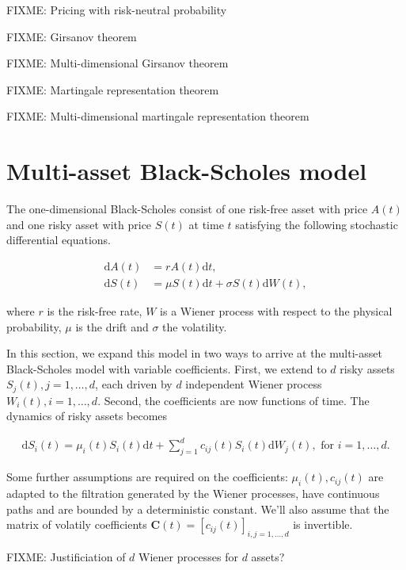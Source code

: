 \documentclass[a4paper]{article}
\begin{document}
FIXME: Pricing with risk-neutral probability

FIXME: Girsanov theorem

FIXME: Multi-dimensional Girsanov theorem

FIXME: Martingale representation theorem

FIXME: Multi-dimensional martingale representation theorem

\pagebreak
\section{Multi-asset Black-Scholes model}


The one-dimensional Black-Scholes consist of one risk-free asset with price $A(t)$ and one risky asset with price $S(t)$ at time $t$ satisfying the following stochastic differential equations.

\begin{align*}
  \mathrm{d}A(t) &= r A(t) \mathrm{d}t,\\
  \mathrm{d}S(t) &= \mu S(t) \mathrm{d}t + \sigma S(t) \mathrm{d}W(t),
\end{align*}

where $r$ is the risk-free rate, $W$ is a Wiener process with respect to the physical probability, $\mu$ is the drift and $\sigma$ the volatility.

In this section, we expand this model in two ways to arrive at the multi-asset Black-Scholes model with variable coefficients. First, we extend to $d$ risky assets $S_j(t), j =  1, \ldots, d$, each driven by $d$ independent Wiener process $W_i(t), i = 1, \ldots, d$. Second, the coefficients are now functions of time. The dynamics of risky assets becomes

\begin{align}\label{eq:multi-bs-eq}
  \mathrm{d}S_i(t) = \mu_i(t) S_i(t) \mathrm{d}t + \sum_{j=1}^{d} c_{ij}(t) S_i(t) \mathrm{d}W_j(t), \text{ for } i = 1,\ldots,d.
\end{align}

Some further assumptions are required on the coefficients: $\mu_i(t), c_{ij}(t)$ are adapted to the filtration generated by the Wiener processes, have continuous paths and are bounded by a deterministic constant. We'll also assume that the matrix of volatily coefficients $\mathbf{C}(t) = [c_{ij}(t)]_{i,j=1,\ldots,d}$ is invertible.

FIXME: Justificiation of $d$ Wiener processes for $d$ assets?
\end{document}
